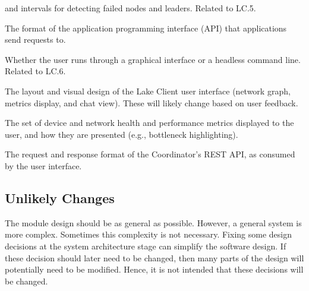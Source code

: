 \documentclass[12pt, titlepage]{article}
\newcounter{acnum}
\newcommand{\actheacnum}{AC\theacnum}
\begin{document}
\begin{description}
  and intervals for detecting failed nodes and leaders. Related to LC.5.
\item[\refstepcounter{acnum} \actheacnum \label{acAPI}:] The format of the
  application programming interface (API) that applications send requests
  to.
\item[\refstepcounter{acnum} \actheacnum \label{acUI}:] Whether the user runs
  \progname{} through a graphical interface or a headless command line.
  Related to LC.6.
\item[\refstepcounter{acnum} \actheacnum \label{acUILayout}:] The layout and
  visual design of the Lake Client user interface (network graph, metrics
  display, and chat view). These will likely change based on user feedback.
\item[\refstepcounter{acnum} \actheacnum \label{acMetrics}:] The set of device and
  network health and performance metrics displayed to the user, and how they are
  presented (e.g., bottleneck highlighting).
\item[\refstepcounter{acnum} \actheacnum \label{acCoordAPI}:] The request and
  response format of the Coordinator's REST API, as consumed by the user
  interface.
\end{description}

\subsection{Unlikely Changes} \label{SecUchange}

The module design should be as general as possible. However, a general system is
more complex. Sometimes this complexity is not necessary. Fixing some design
decisions at the system architecture stage can simplify the software design. If
these decision should later need to be changed, then many parts of the design
will potentially need to be modified. Hence, it is not intended that these
decisions will be changed.
\end{document}
